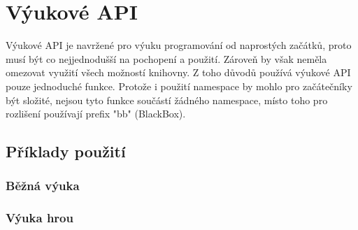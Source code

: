 \chapter{Výukové API}

Výukové API je navržené pro výuku programování od naprostých začátků, proto musí být co nejjednodušší na pochopení a použití.
Zároveň by však neměla omezovat využití všech možností knihovny.
Z toho důvodů používá výukové API pouze jednoduché funkce.
Protože i použití namespace by mohlo pro začátečníky být složité, nejsou tyto funkce součástí žádného namespace, místo toho pro rozlišení používají prefix "bb" (BlackBox).



\section{Příklady použití}

\subsection{Běžná výuka}

\subsection{Výuka hrou}
